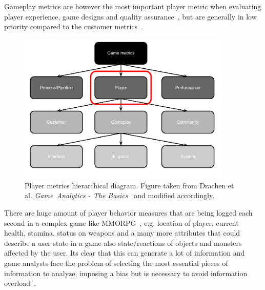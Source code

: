 Gameplay metrics are however the most important player metric when evaluating player experience, game designs and quality assurance~\citep{Kim:2008Tracking, Drachen:2012, Drachen:2011Evaluating}, but are generally in low priority compared to the customer metrics~\citep{Drachen:2013Basics}.
\begin{figure}[here]
\centerline{\includegraphics[width=0.9\textwidth]{Figures/Hierarchical_diagram_gamemetrics.pdf}}
\caption{Player metrics hierarchical diagram. Figure taken from Drachen et al. \textit{Game~Analytics - The Basics}~\citep{Drachen:2013Basics} and modified accordingly. }
\label{fig:gamemetrics}
\end{figure}
There are huge amount of player behavior measures that are being logged each second in a complex game like MMORPG~\citep{Kim:2008Tracking, Drachen:2011Evaluating}, e.g. location of player, current health, stamina, status on weapons and a many more attributes that could describe a user state in a game also state/reactions of objects and monsters affected by the user. Its clear that this can generate a lot of information and game analysts face the problem of selecting the most essential pieces of information to analyze, imposing a bias but is necessary to avoid information overload~\citep{Drachen:2013Basics}. 

